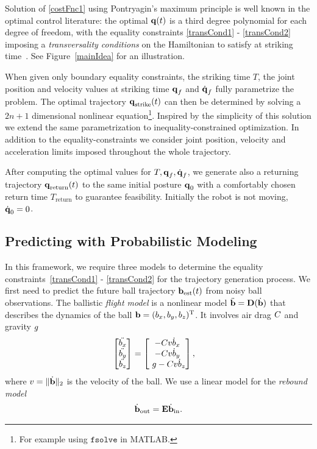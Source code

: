 Solution of \eqref{costFnc1} using Pontryagin's maximum principle is well known in the optimal control literature: the optimal $\boldsymbol{\mathrm{q}}(t)$ is a third degree polynomial for each degree of freedom, with the equality constraints \eqref{transCond1} - \eqref{transCond2} imposing a \emph{transversality conditions} on the Hamiltonian to satisfy at striking time~\cite{Schaettler12}. See Figure~\ref{mainIdea} for an illustration. %

When given only boundary equality constraints, the striking time $T$, the joint position and velocity values at striking time $\boldsymbol{\mathrm{q}}_f$ and $\dot{\boldsymbol{\mathrm{q}}}_f$ fully parametrize the problem. The optimal trajectory $\boldsymbol{\mathrm{q}}_{\mathrm{strike}}(t)$ can then be determined by solving a $2n+1$ dimensional nonlinear equation\footnote{For example using $\mathtt{fsolve}$ in MATLAB.}. Inspired by the simplicity of this solution we extend the same parametrization to inequality-constrained optimization. In addition to the equality-constraints we consider joint position, velocity and acceleration limits imposed throughout the whole trajectory.

After computing the optimal values for $T, \boldsymbol{\mathrm{q}}_f, \dot{\boldsymbol{\mathrm{q}}}_f$, we generate also a returning trajectory $\boldsymbol{\mathrm{q}}_{\mathrm{return}}(t)$ to the same initial posture $\boldsymbol{\mathrm{q}}_0$ with a comfortably chosen return time $T_{\mathrm{return}}$ to guarantee feasibility. Initially the robot is not moving, $\dot{\boldsymbol{\mathrm{q}}}_0 = 0$.

\subsection{Predicting with Probabilistic Modeling}\label{sectionPredict}
 
In this framework, we require three models to determine the equality constraints~\eqref{transCond1} - \eqref{transCond2} for the trajectory generation process. We first need to predict the future ball trajectory $\boldsymbol{\mathrm{b}}_{\mathrm{est}}(t)$ from noisy ball observations.  The ballistic \emph{flight model} is a nonlinear model $\ddot{\boldsymbol{\mathrm{b}}} = \boldsymbol{\mathrm{D}}(\dot{\boldsymbol{\mathrm{b}}})$ that describes the dynamics of the ball $\boldsymbol{\mathrm{b}} = (b_x,b_y,b_z)^{\mathrm{T}}$. It involves air drag $C$ and gravity $g$
%
\begin{align}
\begin{bmatrix}
   \ddot{b_x} \\
   \ddot{b_y} \\
   \ddot{b_z}   
 \end{bmatrix} &= 
 \begin{bmatrix}
 -C v \dot{b}_x  \\
 -C v \dot{b}_y  \\
 \ g - C v \dot{b}_z 
 \end{bmatrix},
\label{flightModel}
\end{align}
%
\noindent where $v = \|\dot{\boldsymbol{\mathrm{b}}}\|_2$ is the velocity of the ball. We use a linear model for the \emph{rebound model}
%
\begin{align}
\dot{\boldsymbol{\mathrm{b}}}_{\mathrm{out}} = \boldsymbol{\mathrm{E}}\dot{\boldsymbol{\mathrm{b}}}_{\mathrm{in}}.
\label{reboundModel}
\end{align}

